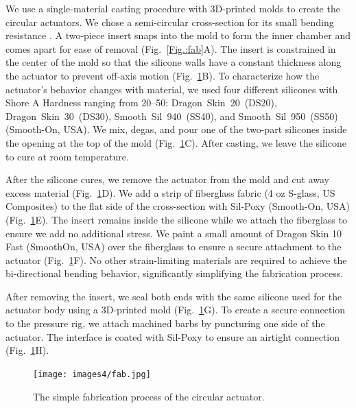 We use a single-material casting procedure with 3D-printed molds to create the circular actuators. We chose a semi-circular cross-section for its small bending resistance \cite{polygerinos_modeling_2015}. A two-piece insert snaps into the mold to form the inner chamber and comes apart for ease of removal (Fig.~\ref{Fig.:fab}A). The insert is constrained in the center of the mold so that the silicone walls have a constant thickness along the actuator to prevent off-axis motion (Fig.~\ref{figure:fab}B). To characterize how the actuator's behavior changes with material, we used four different silicones with Shore A Hardness ranging from 20--50: Dragon~Skin~20~(DS20), Dragon~Skin~30~(DS30), Smooth~Sil~940~(SS40), and Smooth~Sil~950~(SS50) (Smooth-On, USA). We mix, degas, and pour one of the two-part silicones inside the opening at the top of the mold (Fig.~\ref{figure:fab}C). After casting, we leave the silicone to cure at room temperature. 

After the silicone cures, we remove the actuator from the mold and cut away excess material (Fig.~\ref{figure:fab}D). We add a strip of fiberglass fabric (4 oz S-glass, US Composites) to the flat side of the cross-section with Sil-Poxy (Smooth-On, USA) (Fig.~\ref{figure:fab}E). The insert remains inside the silicone while we attach the fiberglass to ensure we add no additional stress. We paint a small amount of Dragon Skin 10 Fast (SmoothOn, USA) over the fiberglass to ensure a secure attachment to the actuator (Fig.~\ref{figure:fab}F). No other strain-limiting materials are required to achieve the bi-directional bending behavior, significantly simplifying the fabrication process. 

After removing the insert, we seal both ends with the same silicone used for the actuator body using a 3D-printed mold (Fig.~\ref{figure:fab}G). To create a secure connection to the pressure rig, we attach machined barbs by puncturing one side of the actuator. The interface is coated with Sil-Poxy to ensure an airtight connection (Fig.~\ref{figure:fab}H).

\begin{figure}[h!]
    \centering
     \texttt{[image: images4/fab.jpg]}
    \caption{The simple fabrication process of the circular actuator.}
    \label{figure:fab}
\end{figure}